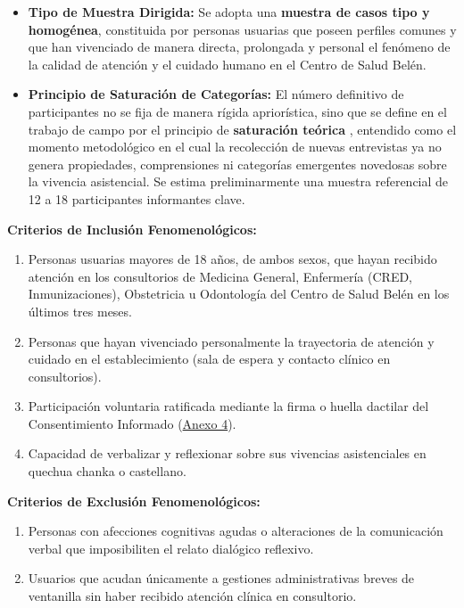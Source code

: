 \begin{itemize}
    \item \textbf{Tipo de Muestra Dirigida:} Se adopta una \textbf{muestra de casos tipo y homogénea}, constituida por personas usuarias que poseen perfiles comunes y que han vivenciado de manera directa, prolongada y personal el fenómeno de la calidad de atención y el cuidado humano en el Centro de Salud Belén.
    \item \textbf{Principio de Saturación de Categorías:} El número definitivo de participantes no se fija de manera rígida apriorística, sino que se define en el trabajo de campo por el principio de \textbf{saturación teórica} \cite{esbensen2008}, entendido como el momento metodológico en el cual la recolección de nuevas entrevistas ya no genera propiedades, comprensiones ni categorías emergentes novedosas sobre la vivencia asistencial. Se estima preliminarmente una muestra referencial de 12 a 18 participantes informantes clave.
\end{itemize}

\textbf{Criterios de Inclusión Fenomenológicos:}
\begin{enumerate}
    \item Personas usuarias mayores de 18 años, de ambos sexos, que hayan recibido atención en los consultorios de Medicina General, Enfermería (CRED, Inmunizaciones), Obstetricia u Odontología del Centro de Salud Belén en los últimos tres meses.
    \item Personas que hayan vivenciado personalmente la trayectoria de atención y cuidado en el establecimiento (sala de espera y contacto clínico en consultorios).
    \item Participación voluntaria ratificada mediante la firma o huella dactilar del Consentimiento Informado (\hyperref[anx:4_consentimiento]{Anexo 4}).
    \item Capacidad de verbalizar y reflexionar sobre sus vivencias asistenciales en quechua chanka o castellano.
\end{enumerate}

\textbf{Criterios de Exclusión Fenomenológicos:}
\begin{enumerate}
    \item Personas con afecciones cognitivas agudas o alteraciones de la comunicación verbal que imposibiliten el relato dialógico reflexivo.
    \item Usuarios que acudan únicamente a gestiones administrativas breves de ventanilla sin haber recibido atención clínica en consultorio.
\end{enumerate}

